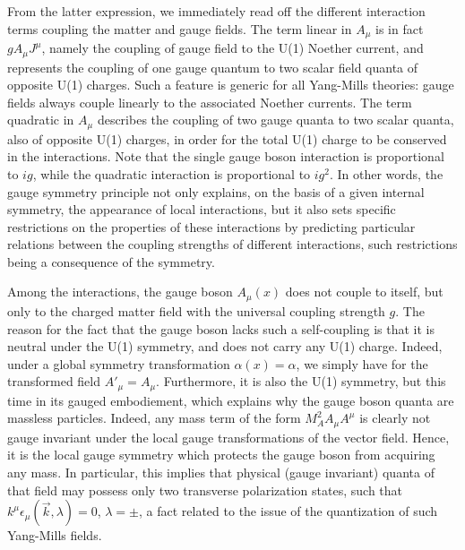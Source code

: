\documentclass[a4paper,11pt]{article}
\begin{document}
From the latter expression, we immediately read off the different interaction
terms coupling the matter and gauge fields. The term linear in $A_\mu$ is
in fact $gA_\mu J^\mu$, namely the coupling of gauge field to the U(1)
Noether current, and represents the coupling of one gauge quantum to
two scalar field quanta of opposite U(1) charges. Such a feature is generic
for all Yang-Mills theories: gauge fields always couple linearly to the
associated Noether currents. The term quadratic in $A_\mu$ describes the 
coupling of two gauge quanta to two scalar quanta, also of opposite
U(1) charges, in order for the total U(1) charge to be conserved in the
interactions. Note that the single gauge boson interaction is proportional
to $ig$, while the quadratic interaction is proportional to $ig^2$.
In other words, the gauge symmetry principle not only explains, on the basis
of a given internal symmetry, the appearance of local interactions, but
it also sets specific restrictions on the properties of these interactions
by predicting particular relations between the coupling strengths of
different interactions, such restrictions being a consequence of the symmetry.

Among the interactions, the gauge boson $A_\mu(x)$ does not couple to itself,
but only to the charged matter field with the universal coupling strength $g$.
The reason for the fact that the gauge boson lacks such a self-coupling 
is that it is neutral under the U(1) symmetry, and does not carry any 
U(1) charge. Indeed, under a global symmetry transformation 
$\alpha(x)=\alpha$, we simply have for the transformed field $A'_\mu=A_\mu$. 
Furthermore, it is also the U(1) symmetry, but this time in its gauged 
embodiement, which explains why the gauge boson quanta are massless 
particles. Indeed, any mass term of the form $M^2_AA_\mu A^\mu$ is clearly 
not gauge invariant under the local gauge transformations of the vector 
field. Hence, it is the local gauge symmetry which protects the gauge 
boson from acquiring any mass. In particular, this implies that physical 
(gauge invariant) quanta of that field may possess only two transverse 
polarization states, such that $k^\mu\epsilon_\mu(\vec{k},\lambda)=0$, 
$\lambda=\pm$, a fact related to the issue of the quantization of such 
Yang-Mills fields.
\end{document}
